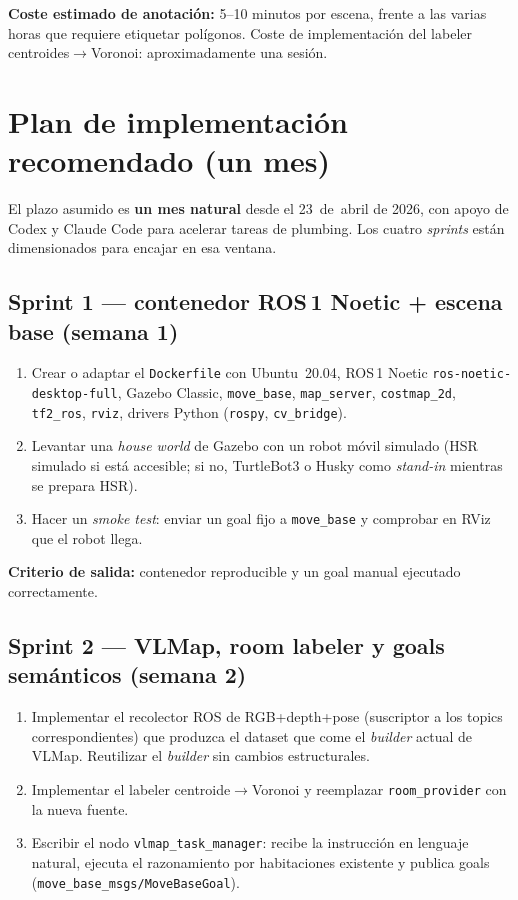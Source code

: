 \documentclass[11pt,a4paper]{article}
\begin{document}
\textbf{Coste estimado de anotación:} 5--10 minutos por escena, frente a las
varias horas que requiere etiquetar polígonos. Coste de implementación del
labeler centroides$\rightarrow$Voronoi: aproximadamente una sesión.

\section{Plan de implementación recomendado (un mes)}

El plazo asumido es \textbf{un mes natural} desde el 23~de~abril de 2026,
con apoyo de Codex y Claude Code para acelerar tareas de plumbing. Los cuatro
\emph{sprints} están dimensionados para encajar en esa ventana.

\subsection*{Sprint 1 --- contenedor ROS\,1 Noetic + escena base (semana 1)}
\begin{enumerate}
  \item Crear o adaptar el \texttt{Dockerfile} con Ubuntu~20.04, ROS\,1 Noetic
        \texttt{ros-noetic-desktop-full}, Gazebo Classic, \texttt{move\_base},
        \texttt{map\_server}, \texttt{costmap\_2d}, \texttt{tf2\_ros},
        \texttt{rviz}, drivers Python (\texttt{rospy}, \texttt{cv\_bridge}).
  \item Levantar una \emph{house world} de Gazebo con un robot móvil simulado
        (HSR simulado si está accesible; si no, TurtleBot3 o Husky como
        \emph{stand-in} mientras se prepara HSR).
  \item Hacer un \emph{smoke test}: enviar un goal fijo a \texttt{move\_base} y
        comprobar en RViz que el robot llega.
\end{enumerate}

\textbf{Criterio de salida:} contenedor reproducible y un goal manual ejecutado
correctamente.

\subsection*{Sprint 2 --- VLMap, room labeler y goals semánticos (semana 2)}
\begin{enumerate}
  \item Implementar el recolector ROS de RGB+depth+pose (suscriptor a los
        topics correspondientes) que produzca el dataset que come el
        \emph{builder} actual de VLMap. Reutilizar el \emph{builder} sin
        cambios estructurales.
  \item Implementar el labeler centroide$\rightarrow$Voronoi y reemplazar
        \texttt{room\_provider} con la nueva fuente.
  \item Escribir el nodo \texttt{vlmap\_task\_manager}: recibe la instrucción
        en lenguaje natural, ejecuta el razonamiento por habitaciones existente
        y publica goals (\texttt{move\_base\_msgs/MoveBaseGoal}).
\end{enumerate}
\end{document}
